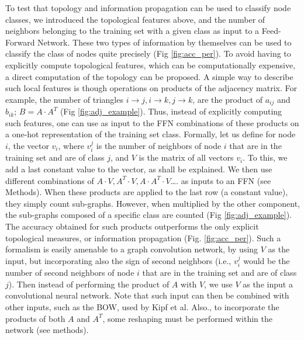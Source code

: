 To test that topology and information propagation can be used to classify node classes, we introduced the topological features above, and the number of neighbors belonging to the training set with a given class as input to a Feed-Forward Network. These two types of information by themselves can be used to classify the class of nodes quite precisely (Fig \ref{fig:acc_per}).
To avoid having to explicitly compute topological features, which can be computationally expensive, a direct computation of the topology can be proposed. A simple way to describe such local features is though operations on products of the adjacency matrix. For example, the number of triangles $i\rightarrow j,i\rightarrow k,j\rightarrow k$, are the product of $a_{ij}$ and $b_{ik}$; $B=A\cdot A^{T}$ (Fig \ref{fig:adj_example}). Thus, instead of explicitly computing such features, one can use as input to the FFN combinations of these products on a one-hot representation of the training set class. Formally, let us define for node $i$, the vector  $v_{i}$, where $v_{i}^{j}$ is the number of neighbors of node $i$ that are in the training set and are of class $j$, and $V$ is the matrix of all vectors $v_{i}$. To this, we add a last constant value to the vector, as shall be explained. We then use different combinations of $A\cdot V, A^{T}\cdot V, A\cdot A^{T}\cdot V$…. as inputs to an FFN (see Methods). 
When these products are applied to the last row (a constant value), they simply count sub-graphs. However, when multiplied by the other component, the sub-graphs composed of a specific class are counted (Fig \ref{fig:adj_example}). The accuracy obtained for such products outperforms the only explicit topological measures, or information propagation (Fig. \ref{fig:acc_per}).
Such a formalism is easily amenable to a graph convolution network, by using $V$ as the input, but incorporating also the sign of second neighbors (i.e.,  $v_{i}^{j}$  would be the number of second neighbors of node $i$ that are in the training set and are of class $j$). Then instead of performing the product of $A$ with $V$, we use $V$ as the input a convolutional neural network. Note that such input can then be combined with other inputs, such as the BOW, used by Kipf et al. Also., to incorporate the products of both $A$ and  $A^{T}$, some reshaping must be performed within the network (see methods).

